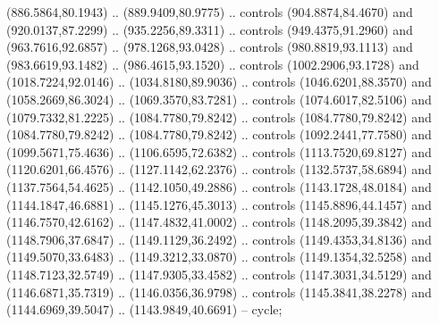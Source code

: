 \begin{scope}[shift={(-127.26916,-608.18524)}]
\begin{scope}
\begin{scope}[shift={(-630.60299,773.9938)},opacity=0.500,transparency group]
        (886.5864,80.1943) .. (889.9409,80.9775) .. controls (904.8874,84.4670) and
        (920.0137,87.2299) .. (935.2256,89.3311) .. controls (949.4375,91.2960) and
        (963.7616,92.6857) .. (978.1268,93.0428) .. controls (980.8819,93.1113) and
        (983.6619,93.1482) .. (986.4615,93.1520) .. controls (1002.2906,93.1728) and
        (1018.7224,92.0146) .. (1034.8180,89.9036) .. controls (1046.6201,88.3570) and
        (1058.2669,86.3024) .. (1069.3570,83.7281) .. controls (1074.6017,82.5106) and
        (1079.7332,81.2225) .. (1084.7780,79.8242) .. controls (1084.7780,79.8242) and
        (1084.7780,79.8242) .. (1084.7780,79.8242) .. controls (1092.2441,77.7580) and
        (1099.5671,75.4636) .. (1106.6595,72.6382) .. controls (1113.7520,69.8127) and
        (1120.6201,66.4576) .. (1127.1142,62.2376) .. controls (1132.5737,58.6894) and
        (1137.7564,54.4625) .. (1142.1050,49.2886) .. controls (1143.1728,48.0184) and
        (1144.1847,46.6881) .. (1145.1276,45.3013) .. controls (1145.8896,44.1457) and
        (1146.7570,42.6162) .. (1147.4832,41.0002) .. controls (1148.2095,39.3842) and
        (1148.7906,37.6847) .. (1149.1129,36.2492) .. controls (1149.4353,34.8136) and
        (1149.5070,33.6483) .. (1149.3212,33.0870) .. controls (1149.1354,32.5258) and
        (1148.7123,32.5749) .. (1147.9305,33.4582) .. controls (1147.3031,34.5129) and
        (1146.6871,35.7319) .. (1146.0356,36.9798) .. controls (1145.3841,38.2278) and
        (1144.6969,39.5047) .. (1143.9849,40.6691) -- cycle;


\end{scope}
\end{scope}
\end{scope}
